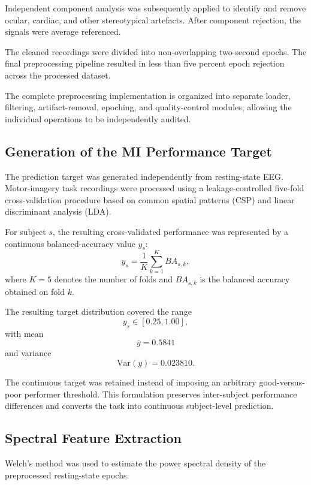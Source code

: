 \documentclass[conference]{IEEEtran}
\begin{document}
Independent component analysis was subsequently applied to identify and remove ocular, cardiac, and other stereotypical artefacts. After component rejection, the signals were average referenced.

The cleaned recordings were divided into non-overlapping two-second epochs. The final preprocessing pipeline resulted in less than five percent epoch rejection across the processed dataset.

The complete preprocessing implementation is organized into separate loader, filtering, artifact-removal, epoching, and quality-control modules, allowing the individual operations to be independently audited.

\subsection{Generation of the MI Performance Target}
The prediction target was generated independently from resting-state EEG. Motor-imagery task recordings were processed using a leakage-controlled five-fold cross-validation procedure based on common spatial patterns (CSP) and linear discriminant analysis (LDA).

For subject $s$, the resulting cross-validated performance was represented by a continuous balanced-accuracy value $y_s$:
\begin{equation}
y_s = \frac{1}{K} \sum_{k=1}^{K} BA_{s,k},
\end{equation}
where $K = 5$ denotes the number of folds and $BA_{s,k}$ is the balanced accuracy obtained on fold $k$.

The resulting target distribution covered the range
\begin{equation}
y_s \in [0.25, 1.00],
\end{equation}
with mean
\begin{equation}
\bar{y} = 0.5841
\end{equation}
and variance
\begin{equation}
\text{Var}(y) = 0.023810.
\end{equation}

The continuous target was retained instead of imposing an arbitrary good-versus-poor performer threshold. This formulation preserves inter-subject performance differences and converts the task into continuous subject-level prediction.

\subsection{Spectral Feature Extraction}
Welch's method was used to estimate the power spectral density of the preprocessed resting-state epochs.
\end{document}
